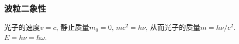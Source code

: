 \documentclass{ctexart}
\begin{document}

\subsubsection{波粒二象性} %
\label{ssub:波粒二象性}

光子的速度$v=c$, 静止质量$m_0 = 0$, $mc^2 = h\nu$, 从而光子的质量$m = h\nu/c^2$. $E = h\nu = \hbar \omega$.



\end{document}
